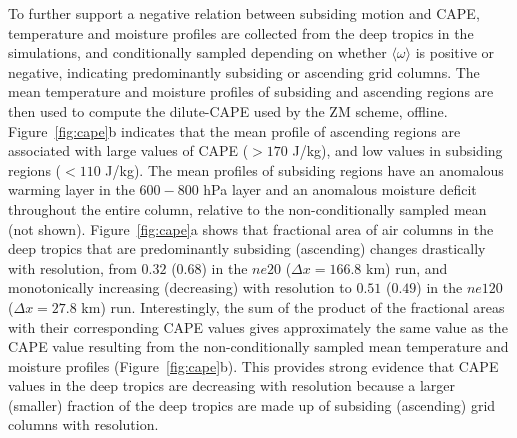 To further support a negative relation between subsiding motion and CAPE, temperature and moisture profiles are collected from the deep tropics in the simulations, and conditionally sampled depending on whether $\langle \omega \rangle$ is positive or negative, indicating predominantly subsiding or ascending grid columns. The mean temperature and moisture profiles of subsiding and ascending regions are then used to compute the dilute-CAPE used by the ZM scheme, offline. Figure~\ref{fig:cape}b indicates that the mean profile of ascending regions are associated with large values of CAPE ($>170$ J/kg), and low values in subsiding regions ($<110$ J/kg). The mean profiles of subsiding regions have an anomalous warming layer in the $600-800$ hPa layer and an anomalous moisture deficit throughout the entire column, relative to the non-conditionally sampled mean (not shown). Figure~\ref{fig:cape}a shows that fractional area of air columns in the deep tropics that are predominantly subsiding (ascending) changes drastically with resolution, from $0.32$ ($0.68$) in the $ne20$ ($\Delta x = 166.8$ km) run, and monotonically increasing (decreasing) with resolution to $0.51$ ($0.49$) in the $ne120$ ($\Delta x = 27.8$ km) run. Interestingly, the sum of the product of the fractional areas with their corresponding CAPE values gives approximately the same value as the CAPE value resulting from the non-conditionally sampled mean temperature and moisture profiles (Figure~\ref{fig:cape}b). This provides strong evidence that CAPE values in the deep tropics are decreasing with resolution because a larger (smaller) fraction of the deep tropics are made up of subsiding (ascending) grid columns with resolution.

